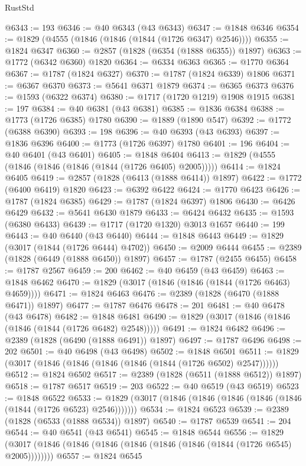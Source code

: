 \begin{lexlean}{RustStd}
\begin{coremodule}
@6343 := 193
@6346 := @40 @6343 (@43 @6343)
@6347 := @1848 @6346
@6354 := @1829 (@4555 (@1846 (@1846 (@1844 (@1726 @6347) @2546))))
@6355 := @1824 @6347
@6360 := @2857 (@1828 (@6354 (@1888 @6355)) @1897)
@6363 := @1772 (@6342 @6360) @1820
@6364 := @6334 @6363
@6365 := @1770 @6364
@6367 := @1787 (@1824 @6327)
@6370 := @1787 (@1824 @6339) @1806
@6371 := @6367 @6370
@6373 := @5641 @6371 @1879
@6374 := @6365 @6373
@6376 := @1593 (@6322 @6374)
@6380 := @1717 (@1720 @1219) @1908 @1915
@6381 := 197
@6384 := @40 @6381 (@43 @6381)
@6385 := @1836 @6384
@6388 := @1773 (@1726 @6385) @1780
@6390 := @1889 (@1890 @547)
@6392 := @1772 (@6388 @6390)
@6393 := 198
@6396 := @40 @6393 (@43 @6393)
@6397 := @1836 @6396
@6400 := @1773 (@1726 @6397) @1780
@6401 := 196
@6404 := @40 @6401 (@43 @6401)
@6405 := @1848 @6404
@6413 := @1829 (@4555 (@1846 (@1846 (@1846 (@1844 (@1726 @6405) @2005)))))
@6414 := @1824 @6405
@6419 := @2857 (@1828 (@6413 (@1888 @6414)) @1897)
@6422 := @1772 (@6400 @6419) @1820
@6423 := @6392 @6422
@6424 := @1770 @6423
@6426 := @1787 (@1824 @6385)
@6429 := @1787 (@1824 @6397) @1806
@6430 := @6426 @6429
@6432 := @5641 @6430 @1879
@6433 := @6424 @6432
@6435 := @1593 (@6380 @6433)
@6439 := @1717 (@1720 @1320) @3013 @1657
@6440 := 199
@6443 := @40 @6440 (@43 @6440)
@6444 := @1848 @6443
@6449 := @1829 (@3017 (@1844 (@1726 @6444) @4702))
@6450 := @2009 @6444
@6455 := @2389 (@1828 (@6449 (@1888 @6450)) @1897)
@6457 := @1787 (@2455 @6455)
@6458 := @1787 @2567
@6459 := 200
@6462 := @40 @6459 (@43 @6459)
@6463 := @1848 @6462
@6470 := @1829 (@3017 (@1846 (@1846 (@1844 (@1726 @6463) @4659))))
@6471 := @1824 @6463
@6476 := @2389 (@1828 (@6470 (@1888 @6471)) @1897)
@6477 := @1787 @6476
@6478 := 201
@6481 := @40 @6478 (@43 @6478)
@6482 := @1848 @6481
@6490 := @1829 (@3017 (@1846 (@1846 (@1846 (@1844 (@1726 @6482) @2548)))))
@6491 := @1824 @6482
@6496 := @2389 (@1828 (@6490 (@1888 @6491)) @1897)
@6497 := @1787 @6496
@6498 := 202
@6501 := @40 @6498 (@43 @6498)
@6502 := @1848 @6501
@6511 := @1829 (@3017 (@1846 (@1846 (@1846 (@1846 (@1844 (@1726 @6502) @2547))))))
@6512 := @1824 @6502
@6517 := @2389 (@1828 (@6511 (@1888 @6512)) @1897)
@6518 := @1787 @6517
@6519 := 203
@6522 := @40 @6519 (@43 @6519)
@6523 := @1848 @6522
@6533 := @1829 (@3017 (@1846 (@1846 (@1846 (@1846 (@1846 (@1844 (@1726 @6523) @2546)))))))
@6534 := @1824 @6523
@6539 := @2389 (@1828 (@6533 (@1888 @6534)) @1897)
@6540 := @1787 @6539
@6541 := 204
@6544 := @40 @6541 (@43 @6541)
@6545 := @1848 @6544
@6556 := @1829 (@3017 (@1846 (@1846 (@1846 (@1846 (@1846 (@1846 (@1844 (@1726 @6545) @2005))))))))
@6557 := @1824 @6545

\end{coremodule}
\end{lexlean}
